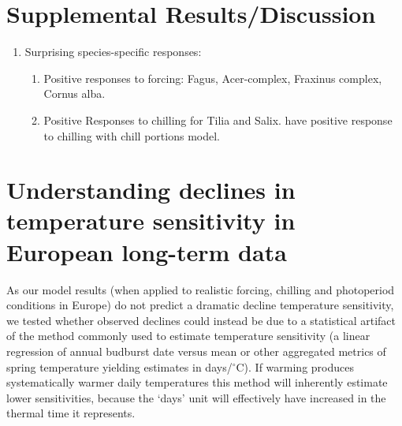 \documentclass{article}
\begin{document}
\section*{Supplemental Results/Discussion}
\begin{enumerate}
\item Surprising species-specific responses: 
\begin{enumerate}

\item Positive responses to forcing: Fagus, Acer-complex, Fraxinus complex, Cornus alba.
\item Positive Responses to chilling for Tilia and Salix.  have positive response to chilling with chill portions model.

\end{enumerate}
\end{enumerate}

\section*{Understanding declines in temperature sensitivity in European long-term data}
As our model results (when applied to realistic forcing, chilling and photoperiod conditions in Europe) do not predict a dramatic decline temperature sensitivity, we tested whether observed declines could instead be due to a statistical artifact of the method commonly used to estimate temperature sensitivity (a linear regression of annual budburst date versus mean or other aggregated metrics of spring temperature yielding estimates in days/$^{\circ}$C). If warming produces systematically warmer daily temperatures this method will inherently estimate lower sensitivities, because the `days' unit will effectively have increased in the thermal time it represents.
\end{document}
